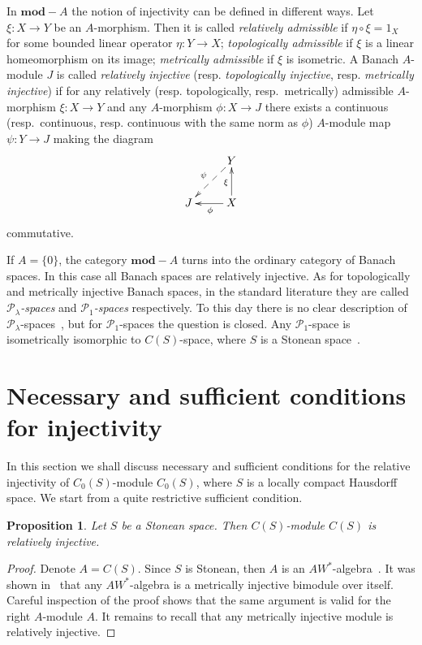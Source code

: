 \documentclass[12pt]{article}
\newtheorem{proposition}[theorem]{Proposition}
\begin{document}
In $\mathbf{mod}-A$ the notion of injectivity can be defined in different ways.
Let $\xi:X\to Y$ be an $A$-morphism. Then it is called 
\textit{relatively admissible} if $\eta\circ \xi=1_X$ 
for some bounded linear operator $\eta:Y\to X$; 
\textit{topologically admissible} if $\xi$ is a linear homeomorphism on its
image; \textit{metrically admissible} if $\xi$ is isometric. A Banach $A$-module
$J$ is called \textit{relatively injective} (resp. \textit{topologically
    injective}, resp. \textit{metrically injective}) if for any relatively (resp.
topologically, resp.\ metrically) admissible $A$-morphism $\xi:X\to Y$ and any
$A$-morphism $\phi:X\to J$ there exists a continuous (resp.\ continuous, resp.
continuous with the same norm as $\phi$) $A$-module map $\psi:Y\to J$ making the
diagram
$$
    \xymatrix{
    & {Y} \\
    {J} \ar@{<--}[ur]^{\psi} &{X} \ar[u]^{\xi} \ar[l]^{\phi}}  %
$$
commutative.

If $A=\{0\}$, the category $\mathbf{mod}-A$ turns into the ordinary category of
Banach spaces. In this case all Banach spaces are relatively injective. As for
topologically and metrically injective Banach spaces, in the standard literature
they are called \textit{$\mathcal{P}_\lambda$-spaces} and
\textit{$\mathcal{P}_1$-spaces} respectively. To this day there is no clear
description of $\mathcal{P}_\lambda$-spaces~\cite[page vi]{AvilSepInjBanSp}, but
for $\mathcal{P}_1$-spaces the question is closed. Any $\mathcal{P}_1$-space is
isometrically isomorphic to $C(S)$-space, where $S$ is a Stonean
space~\cite{HasumExtPropCompBanSp}.


\section{Necessary and sufficient conditions for
  injectivity}\label{SecionNecessaryAndSufficientConditionsForInjectivity}

In this section we shall discuss necessary and sufficient conditions for the
relative injectivity of $C_0(S)$-module $C_0(S)$, where $S$ is a locally compact
Hausdorff space. We start from a quite restrictive sufficient condition.

\begin{proposition}\label{SStonImplRelInjCSModCS} Let $S$ be a Stonean space.
    Then $C(S)$-module $C(S)$ is relatively injective.
\end{proposition}
\begin{proof} Denote $A=C(S)$. Since $S$ is Stonean, then $A$ is an
    $AW^*$-algebra~\cite[section 1, paragraph 7]{BerbBaerStRng}. It was shown
    in~\cite[theorem 2]{TakHanBanThAndJordDecomOfModMap} that any $AW^*$-algebra
    is a metrically injective bimodule over itself. Careful inspection of the
    proof shows that the same argument is valid for the right $A$-module $A$. It
    remains to recall that any metrically injective module is relatively
    injective.
\end{proof}
\end{document}
